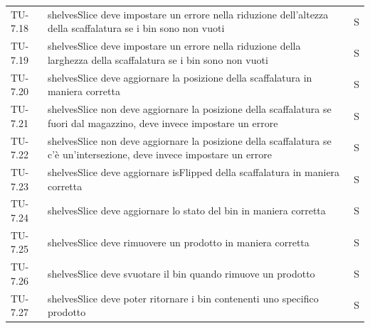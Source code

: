 \begin{xltabular}{0.9\textwidth}{X | p{0.6\textwidth} | p{0.1\textwidth} }
    TU-7.18 & shelvesSlice deve impostare un errore nella riduzione dell'altezza della scaffalatura se i bin sono non vuoti & S\\
    TU-7.19 & shelvesSlice deve impostare un errore nella riduzione della larghezza della scaffalatura se i bin sono non vuoti & S\\
    TU-7.20 & shelvesSlice deve aggiornare la posizione della scaffalatura in maniera corretta & S\\
    TU-7.21 & shelvesSlice non deve aggiornare la posizione della scaffalatura se fuori dal magazzino, deve invece impostare un errore & S\\
    TU-7.22 & shelvesSlice non deve aggiornare la posizione della scaffalatura se c'è un'intersezione, deve invece impostare un errore & S\\
    TU-7.23 & shelvesSlice deve aggiornare isFlipped della scaffalatura in maniera corretta & S\\
    TU-7.24 & shelvesSlice deve aggiornare lo stato del bin in maniera corretta & S\\
    TU-7.25 & shelvesSlice deve rimuovere un prodotto in maniera corretta & S\\
    TU-7.26 & shelvesSlice deve svuotare il bin quando rimuove un prodotto & S\\
    TU-7.27 & shelvesSlice deve poter ritornare i bin contenenti uno specifico prodotto & S\\  
    

\end{xltabular}
